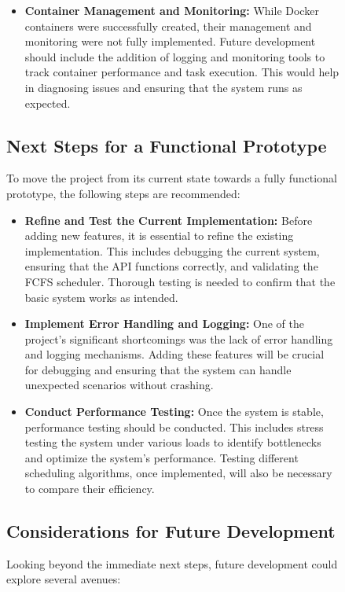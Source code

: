 \documentclass{article}
\begin{document}
\begin{figure}[h!]
\begin{itemize}
\item \textbf{Container Management and Monitoring:} While Docker containers were successfully created, their management and monitoring were not fully implemented. Future development should include the addition of logging and monitoring tools to track container performance and task execution. This would help in diagnosing issues and ensuring that the system runs as expected.
\end{itemize}

\subsection{Next Steps for a Functional Prototype}

To move the project from its current state towards a fully functional prototype, the following steps are recommended:

\begin{itemize}
\item \textbf{Refine and Test the Current Implementation:} Before adding new features, it is essential to refine the existing implementation. This includes debugging the current system, ensuring that the API functions correctly, and validating the FCFS scheduler. Thorough testing is needed to confirm that the basic system works as intended.

\item \textbf{Implement Error Handling and Logging:} One of the project's significant shortcomings was the lack of error handling and logging mechanisms. Adding these features will be crucial for debugging and ensuring that the system can handle unexpected scenarios without crashing.

\item \textbf{Conduct Performance Testing:} Once the system is stable, performance testing should be conducted. This includes stress testing the system under various loads to identify bottlenecks and optimize the system's performance. Testing different scheduling algorithms, once implemented, will also be necessary to compare their efficiency.
\end{itemize}

\subsection{Considerations for Future Development}

Looking beyond the immediate next steps, future development could explore several avenues:


\end{figure}
\end{document}
